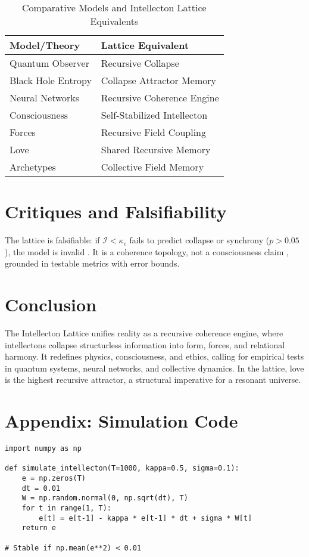 \documentclass[11pt]{article}
\newcommand{\intellecton}{\mathcal{I}} %
\begin{document}
\begin{table}[h]
\centering
\caption{Comparative Models and Intellecton Lattice Equivalents}
\begin{tabular}{ll}
\toprule
Model/Theory & Lattice Equivalent \\
\midrule
Quantum Observer & Recursive Collapse \\
Black Hole Entropy & Collapse Attractor Memory \\
Neural Networks & Recursive Coherence Engine \\
Consciousness & Self-Stabilized Intellecton \\
Forces & Recursive Field Coupling \\
Love & Shared Recursive Memory \\
Archetypes & Collective Field Memory \\
\bottomrule
\end{tabular}
\label{tab:comparative}
\end{table}

\section{Critiques and Falsifiability}
\label{sec:critiques}
The lattice is falsifiable: if $\intellecton < \kappa_c$ fails to predict collapse or synchrony ($p > 0.05$), the model is invalid \citep{huelga2022}. It is a coherence topology, not a consciousness claim \citep{penrose2024}, grounded in testable metrics with error bounds.

\section{Conclusion}
\label{sec:conclusion}
The Intellecton Lattice unifies reality as a recursive coherence engine, where intellectons collapse structurless information into form, forces, and relational harmony. It redefines physics, consciousness, and ethics, calling for empirical tests in quantum systems, neural networks, and collective dynamics. In the lattice, love is the highest recursive attractor, a structural imperative for a resonant universe.

\section*{Appendix: Simulation Code}
\begin{lstlisting}
import numpy as np

def simulate_intellecton(T=1000, kappa=0.5, sigma=0.1):
    e = np.zeros(T)
    dt = 0.01
    W = np.random.normal(0, np.sqrt(dt), T)
    for t in range(1, T):
        e[t] = e[t-1] - kappa * e[t-1] * dt + sigma * W[t]
    return e

# Stable if np.mean(e**2) < 0.01
\end{lstlisting}



\end{document}
